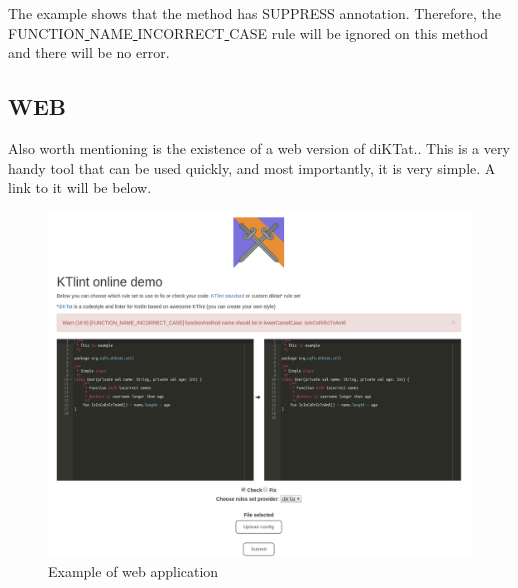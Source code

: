 The example shows that the method has SUPPRESS annotation. Therefore, the \\ FUNCTION\underline{ }NAME\underline{ }INCORRECT\underline{ }CASE rule will be ignored on this method and there will be no error.\\

\subsection{WEB}
\par
Also worth mentioning is the existence of a web version of diKTat.. This is a very handy tool that can be used quickly, and most importantly, it is very simple. A link to it will be below.
\begin{figure}[H]
  \centering
  \includegraphics[scale=0.3]{wp/pictures/web-example.png}
  \caption{Example of web application}   
\end{figure} 